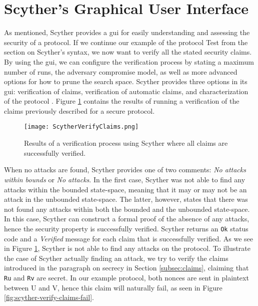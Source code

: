 \section{Scyther's Graphical User Interface}

As mentioned, Scyther provides a \gls{gui} for easily understanding and assessing the security of a protocol. If we continue our example of the protocol Test from the section on Scyther's syntax, we now want to verify all the stated security claims. By using the \gls{gui}, we can configure the verification process by stating a maximum number of runs, the adversary compromise model, as well as more advanced options for how to prune the search space. Scyther provides three options in its \gls{gui}: verification of claims, verification of automatic claims, and characterization of the protocol \cite{cremers2008scyther}. Figure \ref{fig:scyther-verify-claims} contains the results of running a verification of the claims previously described for a secure protocol.

\begin{figure}[h]
	\centering
	\texttt{[image: ScytherVerifyClaims.png]}
	\caption{Results of a verification process using Scyther where all claims are successfully verified.}
	\label{fig:scyther-verify-claims}
\end{figure}

When no attacks are found, Scyther provides one of two comments: \emph{No attacks within bounds} or \emph{No attacks}. In the first case, Scyther was not able to find any attacks within the bounded state-space, meaning that it may or may not be an attack in the unbounded state-space. The latter, however, states that there was not found any attacks within both the bounded and the unbounded state-space. In this case, Scyther can construct a formal proof of the absence of any attacks, hence the security property is successfully verified. Scyther returns an \texttt{Ok} status code and a \emph{Verified} message for each claim that is successfully verified. As we see in Figure \ref{fig:scyther-verify-claims}, Scyther is not able to find any attacks on the protocol. To illustrate the case of Scyther actually finding an attack, we try to verify the claims introduced in the paragraph on secrecy in Section \ref{subsec:claims}, claiming that \texttt{Ru} and \texttt{Rv} are secret. In our example protocol, both nonces are sent in plaintext between U and V, hence this claim will naturally fail, as seen in Figure \ref{fig:scyther-verify-claims-fail}.


